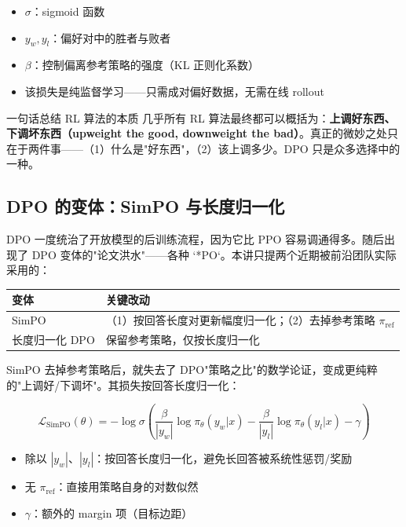 \documentclass[a4paper]{article}
\begin{document}
\begin{itemize}
\item $\sigma$：sigmoid 函数
\item $y_w, y_l$：偏好对中的胜者与败者
\item $\beta$：控制偏离参考策略的强度（KL 正则化系数）
\item 该损失是纯监督学习——只需成对偏好数据，无需在线 rollout
\end{itemize}

\begin{knowledgebox}{一句话总结 RL 算法的本质}
几乎所有 RL 算法最终都可以概括为：\textbf{上调好东西、下调坏东西（upweight the good, downweight the bad）}。真正的微妙之处只在于两件事——（1）什么是"好东西"，（2）该上调多少。DPO 只是众多选择中的一种。
\end{knowledgebox}

\subsection{DPO 的变体：SimPO 与长度归一化}

DPO 一度统治了开放模型的后训练流程，因为它比 PPO 容易调通得多。随后出现了 DPO 变体的"论文洪水"——各种 `*PO`。本讲只提两个近期被前沿团队实际采用的：

\begin{tabular}{p{3cm}p{10cm}}
\toprule
\textbf{变体} & \textbf{关键改动} \\
\midrule
SimPO & （1）按回答长度对更新幅度归一化；（2）去掉参考策略 $\pi_{\text{ref}}$ \\
长度归一化 DPO & 保留参考策略，仅按长度归一化 \\
\bottomrule
\end{tabular}

SimPO 去掉参考策略后，就失去了 DPO"策略之比"的数学论证，变成更纯粹的"上调好/下调坏"。其损失按回答长度归一化：

\[
\mathcal{L}_{\text{SimPO}}(\theta) = -\log \sigma\!\left( \frac{\beta}{|y_w|} \log \pi_\theta(y_w|x) - \frac{\beta}{|y_l|} \log \pi_\theta(y_l|x) - \gamma \right)
\]

\begin{itemize}
\item 除以 $|y_w|$、$|y_l|$：按回答长度归一化，避免长回答被系统性惩罚/奖励
\item 无 $\pi_{\text{ref}}$：直接用策略自身的对数似然
\item $\gamma$：额外的 margin 项（目标边距）
\end{itemize}
\end{document}
